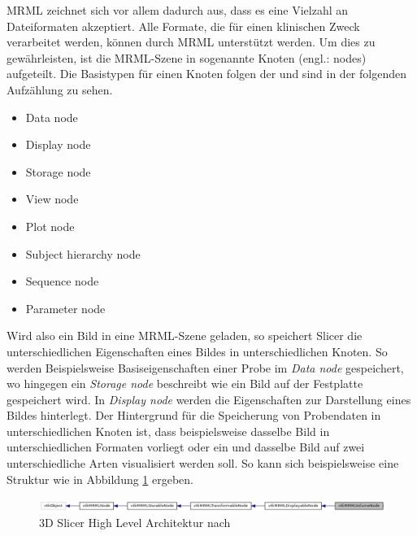 \ac{MRML} zeichnet sich vor allem dadurch aus, dass es eine Vielzahl an
Dateiformaten akzeptiert. Alle Formate, die für einen klinischen Zweck
verarbeitet werden, können durch \ac{MRML} unterstützt werden. Um dies zu gewährleisten,
ist die \ac{MRML}-Szene in sogenannte Knoten (engl.: nodes) aufgeteilt. Die
Basistypen für einen Knoten folgen der \citet{slicer2024} und sind in der folgenden
Aufzählung zu sehen.

\begin{minipage}{0.45\textwidth}
	\begin{itemize}
		\item Data node

		\item Display node

		\item Storage node

		\item View node
	\end{itemize}
\end{minipage}
\hfill
\begin{minipage}{0.45\textwidth}
	\begin{itemize}
		\item Plot node

		\item Subject hierarchy node

		\item Sequence node

		\item Parameter node
	\end{itemize}
\end{minipage}

Wird also ein Bild in eine \ac{MRML}-Szene geladen, so speichert Slicer die
unterschiedlichen Eigenschaften eines Bildes in unterschiedlichen Knoten. So werden
Beispielsweise Basiseigenschaften einer Probe im \textit{Data node} gespeichert,
wo hingegen ein \textit{Storage node} beschreibt wie ein Bild auf der Festplatte
gespeichert wird. In \textit{Display node} werden die Eigenschaften zur
Darstellung eines Bildes hinterlegt. Der Hintergrund für die Speicherung von Probendaten
in unterschiedlichen Knoten ist, dass beispielsweise dasselbe Bild in
unterschiedlichen Formaten vorliegt oder ein und dasselbe Bild auf zwei
unterschiedliche Arten visualisiert werden soll. So kann sich beispielsweise eine
Struktur wie in Abbildung \ref{fig:3d_slicer_class} ergeben.

\begin{figure}[h]
	\centering
	\includegraphics[width=1\textwidth]{img/slicer_class_index.jpg}
	\caption{3D Slicer High Level Architektur nach \citet{slicer2024}}
	\label{fig:3d_slicer_class}
\end{figure}

